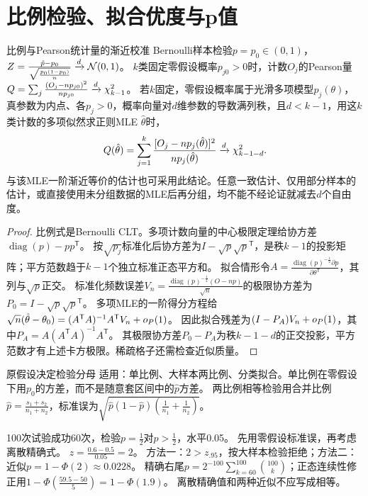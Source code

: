 \section{比例检验、拟合优度与p值}\label{sec:84}
\begin{theorem}{比例与Pearson统计量的渐近校准}
Bernoulli样本检验$p=p_0\in(0,1)$，$Z=\frac{\hat p-p_0}{\sqrt{\frac{p_0(1-p_0)}{n}}}\xrightarrow{d}\mathcal N(0,1)$。
$k$类固定零假设概率$p_{j0}>0$时，计数$O_j$的Pearson量$Q=\sum_j\frac{(O_j-np_{j0})^2}{np_{j0}}\xrightarrow{d}\chi_{k-1}^2$。
若$k$固定，零假设概率属于光滑多项模型$p_j(\theta)$，真参数为内点、各$p_j>0$，概率向量对$d$维参数的导数满列秩，且$d<k-1$，用这$k$类计数的多项似然求正则MLE $\hat\theta$时，
\[Q(\hat\theta)=\sum_{j=1}^k\dfrac{[O_j-np_j(\hat\theta)]^2}{np_j(\hat\theta)}\xrightarrow{d}\chi_{k-1-d}^2.\]
与该MLE一阶渐近等价的估计也可采用此结论。任意一致估计、仅用部分样本的估计，或直接使用未分组数据的MLE后再分组，均不能不经论证就减去$d$个自由度。
\end{theorem}
\begin{proof}
比例式是Bernoulli CLT。多项计数向量的中心极限定理给协方差$\operatorname{diag}(p)-pp^\mathsf T$。
按$\sqrt{p_j}$标准化后协方差为$I-\sqrt p\sqrt p^\mathsf T$，是秩$k-1$的投影矩阵；平方范数趋于$k-1$个独立标准正态平方和。
拟合情形令$A=\frac{\operatorname{diag}(p)^{-\frac{1}{2}}\partial p}{\partial\theta^\mathsf T}$，其列与$\sqrt p$正交。
标准化频数误差$V_n=\frac{\operatorname{diag}(p)^{-\frac{1}{2}}(O-np)}{\sqrt n}$的极限协方差为$P_0=I-\sqrt p\sqrt p^\mathsf T$。
多项MLE的一阶得分方程给
$\sqrt n(\hat\theta-\theta_0)=(A^\mathsf TA)^{-1}A^\mathsf TV_n+o_{P}(1)$。
因此拟合残差为$(I-P_A)V_n+o_{P}(1)$，其中$P_A=A(A^\mathsf TA)^{-1}A^\mathsf T$。
其极限协方差$P_0-P_A$为秩$k-1-d$的正交投影，平方范数才有上述卡方极限。稀疏格子还需检查近似质量。
\end{proof}
\begin{method}{原假设决定检验分母}
适用：单比例、大样本两比例、分类拟合。单比例在零假设下用$p_0$的方差，而不是随意套区间中的$\hat p$方差。
两比例相等检验用合并比例$\hat p=\frac{s_1+s_2}{n_1+n_2}$，标准误为$\sqrt{\hat p(1-\hat p)(\frac{1}{n_1}+\frac{1}{n_2})}$。
\end{method}
{100次试验成功60次，检验$p=\frac{1}{2}$对$p>\frac{1}{2}$，水平0.05。}
{先用零假设标准误，再考虑离散精确式。}
{$z=\frac{0.6-0.5}{0.05}=2$。
方法一：$2>z_{.95}$，按大样本检验拒绝；方法二：近似$p=1-\Phi(2)\approx0.0228$。
精确右尾$p=2^{-100}\sum_{k=60}^{100}\binom{100}k$；正态连续性修正用$1-\Phi(\frac{59.5-50}{5})=1-\Phi(1.9)$。
离散精确值和两种近似不应写成相等。}
